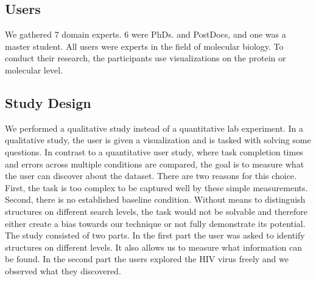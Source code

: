\documentclass[review,journal]{vgtc}         %
\begin{document}
	
	\subsection{Users}
	We gathered 7 domain experts. 6 were PhDs. and PostDocs, and one was a master student. All users were experts in the field of molecular biology. 
	To conduct their research, the participants use visualizations on the protein or molecular level.
	
	
	\subsection{Study Design}
	We performed a qualitative study instead of a quantitative lab experiment.
	In a qualitative study, the user is given a visualization and is tasked with solving some questions. 
	In contrast to a quantitative user study, where task completion times and errors across multiple conditions are compared, the goal is to measure what the user can discover about the dataset.
	There are two reasons for this choice.
	First, the task is too complex to be captured well by these simple measurements. 
	Second, there is no established baseline condition.
	Without means to distinguish structures on different search levels, the task would not be solvable and therefore either create a bias towards our technique or not fully demonstrate its potential.
	The study consisted of two parts. In the first part the user was asked to identify structures on different levels. 
	It also allows us to measure what information can be found.  
	In the second part the users explored the HIV virus freely and we observed what they discovered.
	
	
	
\end{document}

